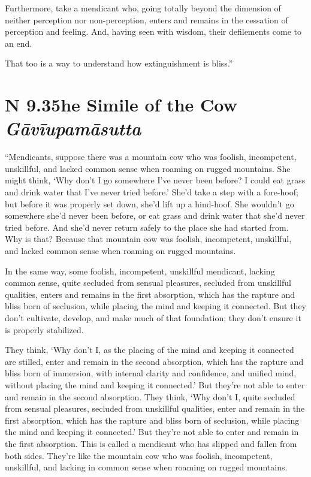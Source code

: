 \documentclass[12pt,openany]{book}%
\newcommand*{\suttatitleacronym}[1]{\smaller[2]{#1}\vspace*{.3em}}
\newcommand*{\suttatitletranslation}[1]{\linebreak{#1}}
\newcommand*{\suttatitleroot}[1]{\linebreak\smaller[2]\itshape{#1}}
\newcommand*{\tocacronym}[1]{\hspace*{-3.3em}{#1}\quad}
\newcommand*{\toctranslation}[1]{#1}
\newcommand*{\tocroot}[1]{(\textit{#1})}
\begin{document}
Furthermore, take a mendicant who, going totally beyond the dimension of neither perception nor non-perception, enters and remains in the cessation of perception and feeling. And, having seen with wisdom, their defilements come to an end. 

That too is a way to understand how extinguishment is bliss.” 

%
\section*{{\suttatitleacronym AN 9.35}{\suttatitletranslation The Simile of the Cow }{\suttatitleroot Gāvīupamāsutta}}
\addcontentsline{toc}{section}{\tocacronym{AN 9.35} \toctranslation{The Simile of the Cow } \tocroot{Gāvīupamāsutta}}

“Mendicants, suppose there was a mountain cow who was foolish, incompetent, unskillful, and lacked common sense when roaming on rugged mountains. She might think, ‘Why don’t I go somewhere I’ve never been before? I could eat grass and drink water that I’ve never tried before.’ She’d take a step with a fore-hoof; but before it was properly set down, she’d lift up a hind-hoof. She wouldn’t go somewhere she’d never been before, or eat grass and drink water that she’d never tried before. And she’d never return safely to the place she had started from. Why is that? Because that mountain cow was foolish, incompetent, unskillful, and lacked common sense when roaming on rugged mountains. 

In the same way, some foolish, incompetent, unskillful mendicant, lacking common sense, quite secluded from sensual pleasures, secluded from unskillful qualities, enters and remains in the first absorption, which has the rapture and bliss born of seclusion, while placing the mind and keeping it connected. But they don’t cultivate, develop, and make much of that foundation; they don’t ensure it is properly stabilized. 

They think, ‘Why don’t I, as the placing of the mind and keeping it connected are stilled, enter and remain in the second absorption, which has the rapture and bliss born of immersion, with internal clarity and confidence, and unified mind, without placing the mind and keeping it connected.’ But they’re not able to enter and remain in the second absorption. They think, ‘Why don’t I, quite secluded from sensual pleasures, secluded from unskillful qualities, enter and remain in the first absorption, which has the rapture and bliss born of seclusion, while placing the mind and keeping it connected.’ But they’re not able to enter and remain in the first absorption. This is called a mendicant who has slipped and fallen from both sides. They’re like the mountain cow who was foolish, incompetent, unskillful, and lacking in common sense when roaming on rugged mountains. 
\end{document}
